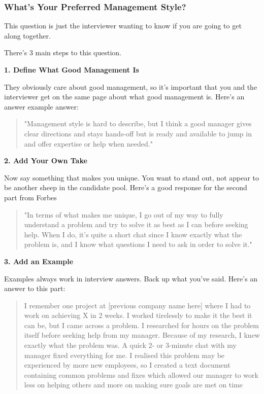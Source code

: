 \documentclass{article}
\begin{document}
\subsubsection{What's Your Preferred Management Style?}
This question is just the interviewer wanting to know if you are going
to get along together.

There's 3 main steps to this question.

\textbf{1. Define What Good Management Is}

They obviously care about good management, so it's important that you
and the interviewer get on the same page about what good management is.
Here's an answer example answer:
\begin{quote}
    "Management style is hard to describe, but I think a good manager gives
clear directions and stays hands-off but is ready and available to jump
in and offer expertise or help when needed."
\end{quote}

\textbf{2. Add Your Own Take}

Now say something that makes you unique. You want to stand out, not
appear to be another sheep in the candidate pool. Here's a good response
for the second part from Forbes

\begin{quote}
    "In terms of what makes me unique, I go out of my way to fully
understand a problem and try to solve it as best as I can before seeking
help. When I do, it's quite a short chat since I know exactly what the
problem is, and I know what questions I need to ask in order to solve
it."
\end{quote}

\textbf{3. Add an Example}

Examples always work in interview answers. Back up what you've said.
Here's an answer to this part:
\begin{quote}
    I remember one project at [previous company name here] where
I had to work on achieving X in 2 weeks. I worked tirelessly to make it
the best it can be, but I came across a problem. I researched for hours
on the problem itself before seeking help from my manager. Because of my
research, I knew exactly what the problem was. A quick 2- or 3-minute
chat with my manager fixed everything for me. I realised this problem
may be experienced by more new employees, so I created a text document
containing common problems and fixes which allowed our manager to work
less on helping others and more on making sure goals are met on time
\end{quote}
\end{document}

